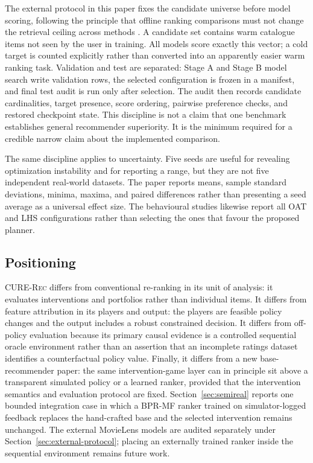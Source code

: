 \documentclass[review]{elsarticle}
\theoremstyle{plain}
\theoremstyle{definition}
\theoremstyle{remark}
\newcommand{\CURE}{\textsc{CURE-Rec}}
\begin{document}
The external protocol in this paper fixes the candidate universe before model scoring, following the principle that offline ranking comparisons must not change the retrieval ceiling across methods \cite{cremonesi2010performance,harper2015movielens}. A candidate set contains warm catalogue items not seen by the user in training. All models score exactly this vector; a cold target is counted explicitly rather than converted into an apparently easier warm ranking task. Validation and test are separated: Stage A and Stage B model search write validation rows, the selected configuration is frozen in a manifest, and final test audit is run only after selection. The audit then records candidate cardinalities, target presence, score ordering, pairwise preference checks, and restored checkpoint state. This discipline is not a claim that one benchmark establishes general recommender superiority. It is the minimum required for a credible narrow claim about the implemented comparison.

The same discipline applies to uncertainty. Five seeds are useful for revealing optimization instability and for reporting a range, but they are not five independent real-world datasets. The paper reports means, sample standard deviations, minima, maxima, and paired differences rather than presenting a seed average as a universal effect size. The behavioural studies likewise report all OAT and LHS configurations rather than selecting the ones that favour the proposed planner.

\subsection{Positioning}

\CURE{} differs from conventional re-ranking in its unit of analysis: it evaluates interventions and portfolios rather than individual items. It differs from feature attribution in its players and output: the players are feasible policy changes and the output includes a robust constrained decision. It differs from off-policy evaluation because its primary causal evidence is a controlled sequential oracle environment rather than an assertion that an incomplete ratings dataset identifies a counterfactual policy value. Finally, it differs from a new base-recommender paper: the same intervention-game layer can in principle sit above a transparent simulated policy or a learned ranker, provided that the intervention semantics and evaluation protocol are fixed. Section~\ref{sec:semireal} reports one bounded integration case in which a BPR-MF ranker trained on simulator-logged feedback replaces the hand-crafted base and the selected intervention remains unchanged. The external MovieLens models are audited separately under Section~\ref{sec:external-protocol}; placing an externally trained ranker inside the sequential environment remains future work.
\end{document}
